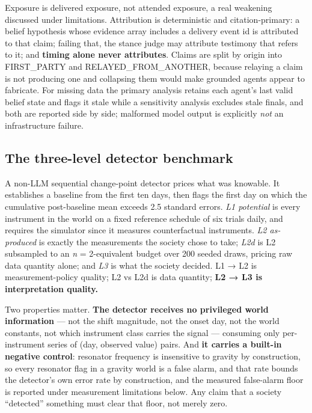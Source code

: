 \documentclass[pdflatex,sn-basic]{sn-jnl}
\begin{document}
Exposure is delivered exposure, not attended exposure, a real weakening discussed under
limitations. Attribution is
deterministic and citation-primary: a belief hypothesis whose evidence array includes a delivery
event id is attributed to that claim; failing that, the stance judge may attribute testimony that
refers to it; and \textbf{timing alone never attributes}. Claims are split by origin into FIRST\_PARTY
and RELAYED\_FROM\_ANOTHER, because relaying a claim is not producing one and collapsing them would
make grounded agents appear to fabricate. For missing data the primary analysis retains each agent's last valid belief state and
flags it stale while a sensitivity analysis excludes stale finals, and both are reported
side by side; malformed model output is explicitly \emph{not} an infrastructure failure.

\hypertarget{the-three-level-detector-benchmark}{%
\subsection{The three-level detector benchmark}\label{the-three-level-detector-benchmark}}

A non-LLM sequential change-point detector prices what
was knowable. It establishes a baseline from the first ten days, then flags the first day on
which the cumulative post-baseline mean exceeds 2.5 standard errors. \emph{L1 potential} is every
instrument in the world on a fixed reference schedule of six trials daily, and requires the
simulator since it measures counterfactual instruments. \emph{L2 as-produced} is exactly the measurements the society chose to take; \emph{L2d} is L2
subsampled to an \emph{n} = 2-equivalent budget over 200 seeded draws, pricing raw data
quantity alone; and \emph{L3} is what the society decided. L1 → L2 is measurement-policy
quality; L2 vs L2d is data quantity; \textbf{L2 → L3 is interpretation quality.}

Two properties matter. \textbf{The detector receives no privileged world information} --- not the
shift magnitude, not the onset day, not the world constants, not which instrument class
carries the signal --- consuming only per-instrument series of (day, observed value) pairs.
And \textbf{it carries a built-in negative control}: resonator frequency is insensitive to
gravity by construction, so every resonator flag in a gravity world is a false alarm, and
that rate bounds the detector's own error rate by construction, and the measured
false-alarm floor is reported under measurement limitations below. Any claim that a society
``detected'' something must clear that floor, not merely zero.
\end{document}
